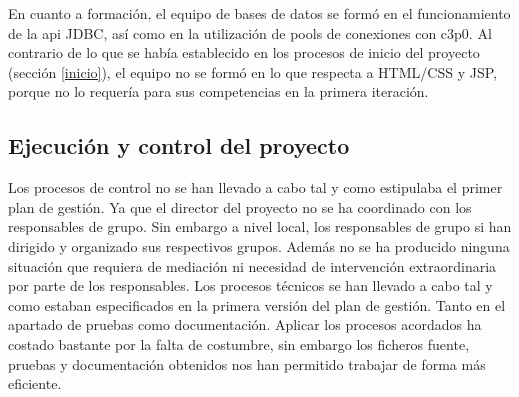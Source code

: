 En cuanto a formación, el equipo de bases de datos se formó en el funcionamiento de la api JDBC, así como en la utilización de pools de conexiones con c3p0. Al contrario de lo que se había establecido en los procesos de inicio del proyecto (sección \ref{inicio}), el equipo no se formó en lo que respecta a HTML/CSS y JSP, porque no lo requería para sus competencias en la primera iteración.
\subsection{Ejecución y control del proyecto}
\label{Ejecucion y control del proyecto}
Los procesos de control no se han llevado a cabo tal y como estipulaba el primer plan de gestión. Ya que el director del proyecto no se ha coordinado con los responsables de grupo. Sin embargo a nivel local, los responsables de grupo si han dirigido y organizado sus respectivos grupos. Además no se ha producido ninguna situación que requiera de mediación ni necesidad de intervención extraordinaria por parte de los responsables. 
Los procesos técnicos se han llevado a cabo tal y como estaban especificados en la primera versión del plan de gestión. Tanto en el apartado de pruebas como documentación. Aplicar los procesos acordados ha costado bastante por la falta de costumbre, sin embargo los ficheros fuente, pruebas y documentación obtenidos nos han permitido trabajar de forma más eficiente.
